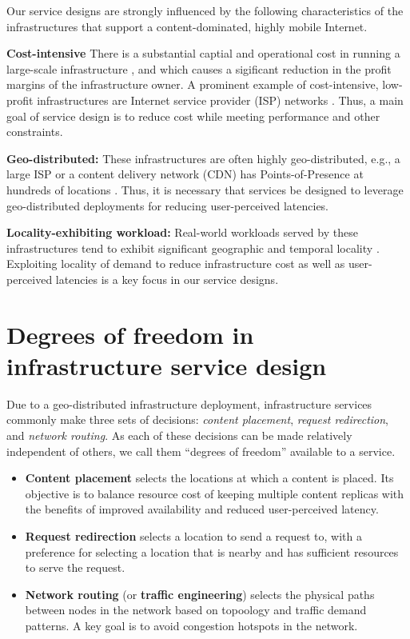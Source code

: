 Our service designs are strongly influenced by the following characteristics of the infrastructures that support a content-dominated, highly mobile Internet.

\textbf{Cost-intensive} There is a substantial captial and operational cost in running a large-scale infrastructure \cite{greenberg2008cost}, and which causes a sigificant reduction in the profit margins of the infrastructure owner. A prominent example of cost-intensive, low-profit infrastructures are Internet service provider (ISP) networks \cite{isp-low-profit}. Thus, a main goal of service design is to reduce cost while meeting performance and other constraints. 

\textbf{Geo-distributed:} These infrastructures are often highly geo-distributed, e.g., a large ISP or a content delivery network (CDN) has Points-of-Presence  at hundreds of locations \cite{dilley2002globally}. Thus, it is necessary that services be designed to leverage geo-distributed deployments for reducing user-perceived latencies.

\textbf{Locality-exhibiting workload:} Real-world workloads served by these infrastructures tend to exhibit significant geographic and temporal locality \cite{NCDN, youtubeUGC, vodP2Pbenefit, cellularvideotraffic}. Exploiting locality of demand to reduce infrastructure cost as well as user-perceived latencies is a key focus in our service designs.

\section{Degrees of freedom in infrastructure service design} 

Due to a geo-distributed infrastructure deployment, infrastructure services commonly make three sets of decisions: \emph{content placement}, \emph{request redirection}, and \emph{network routing}. As each of these decisions can be made relatively independent of others, we call them ``degrees of freedom'' available to a service.

\begin{itemize}
	\item
	\textbf{Content placement} selects the locations at which a content is placed. Its objective  is to balance resource cost of keeping multiple content replicas with the benefits of improved availability and reduced user-perceived latency.
	\item
	\textbf{Request redirection} selects a location to send a request to, with a preference for selecting a location that is nearby and has sufficient resources to serve the request.
	\item
	\textbf{Network routing} (or \textbf{traffic engineering}) selects the physical paths between nodes in the network based on topoology and traffic demand patterns. A key goal is to avoid congestion hotspots in the network.
\end{itemize}


